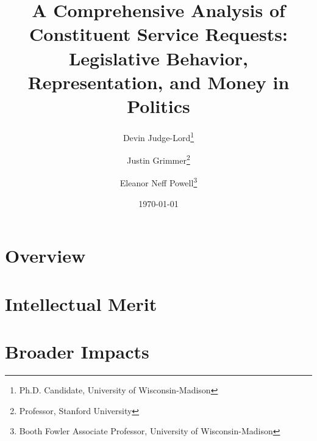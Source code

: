 \documentclass{article}
\title{A Comprehensive Analysis of Constituent Service Requests: Legislative Behavior, Representation, and Money in Politics}
\author{Devin Judge-Lord\thanks{Ph.D. Candidate, University of Wisconsin-Madison}\and Justin Grimmer\thanks{Professor, Stanford University} \and Eleanor Neff Powell\thanks{Booth Fowler Associate Professor, University of Wisconsin-Madison}}
\date{\today}
\begin{document}
\maketitle




\doublespacing

\section{Overview}
\section{Intellectual Merit}
\section{Broader Impacts}
\end{document}
